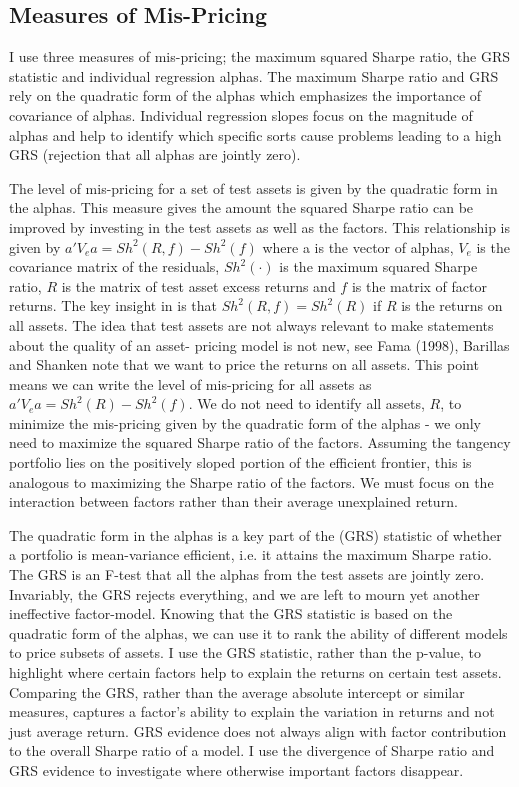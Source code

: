
\subsection{Measures of Mis-Pricing}

I use three measures of mis-pricing; the maximum squared Sharpe ratio, the GRS statistic
and individual regression alphas. The maximum Sharpe ratio and GRS rely on the quadratic
form of the alphas which emphasizes the importance of covariance of alphas. Individual
regression slopes focus on the magnitude of alphas and help to identify which specific
sorts cause problems leading to a high GRS (rejection that all alphas are jointly zero).

The level of mis-pricing for a set of test assets is given by the quadratic form in the
alphas. This measure gives the amount the squared Sharpe ratio can be improved by
investing in the test assets as well as the factors. This relationship is given by
$a'V_ea=Sh^2\left(R,f\right)-Sh^2\left(f\right)$ where a is the vector of alphas, $V_e$ is
the covariance matrix of the residuals, $Sh^2\left(\cdot\right)$ is the maximum squared
Sharpe ratio, $R$ is the matrix of test asset excess returns and $f$ is the matrix of
factor returns. The key insight in \textcite{barillas2016alpha} is that
$Sh^2\left(R,f\right)=Sh^2\left(R\right)$ if $R$ is the returns on all assets. The idea
that test assets are not always relevant to make statements about the quality of an asset-
pricing model is not new, see Fama (1998), Barillas and Shanken note that we want to price
the returns on all assets. This point means we can write the level of mis-pricing for all
assets as $a'V_ea=Sh^2\left(R\right)-Sh^2\left(f\right)$. We do not need to identify all
assets, $R$, to minimize the mis-pricing given by the quadratic form of the alphas - we
only need to maximize the squared Sharpe ratio of the factors. Assuming the tangency
portfolio lies on the positively sloped portion of the efficient frontier, this is
analogous to maximizing the Sharpe ratio of the factors. We must focus on the interaction
between factors rather than their average unexplained return.

The quadratic form in the alphas is a key part of the \textcite{gibbons1989test} (GRS)
statistic of whether a portfolio is mean-variance efficient, i.e. it attains the maximum
Sharpe ratio. The GRS is an F-test that all the alphas from the test assets are jointly
zero. Invariably, the GRS rejects everything, and we are left to mourn yet another
ineffective factor-model. Knowing that the GRS statistic is based on the quadratic form of
the alphas, we can use it to rank the ability of different models to price subsets of
assets. I use the GRS statistic, rather than the p-value, to highlight where certain
factors help to explain the returns on certain test assets. Comparing the GRS, rather than
the average absolute intercept or similar measures, captures a factor’s ability to explain
the variation in returns and not just average return. GRS evidence does not always align
with factor contribution to the overall Sharpe ratio of a model. I use the divergence of
Sharpe ratio and GRS evidence to investigate where otherwise important factors disappear.

